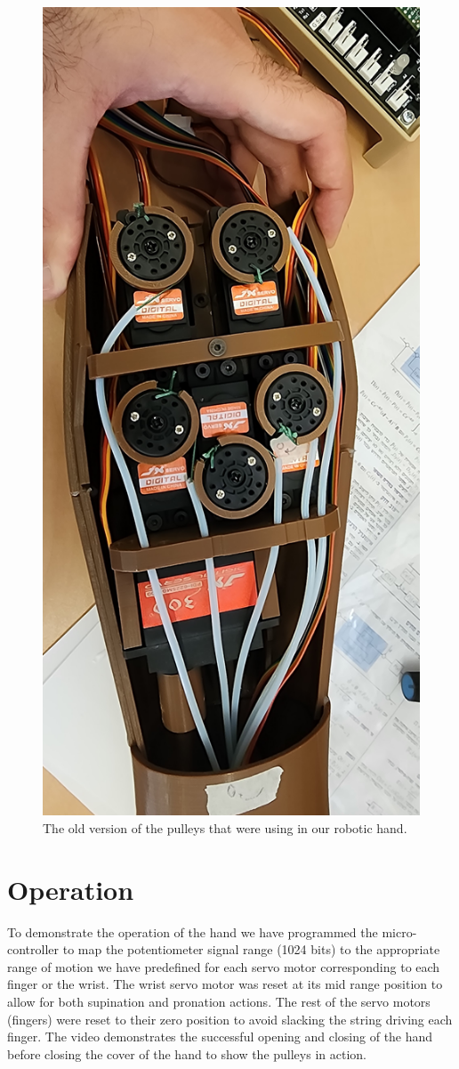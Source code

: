 \documentclass[10pt]{article}
\begin{document}
\begin{figure}[H]
    \centering
    \includegraphics[width=0.5\linewidth]{Final Project/pulleys.jpg}
    \caption{The old version of the pulleys that were using in our robotic hand.}
    \label{fig:pulleys}
\end{figure}

\section*{Operation}
To demonstrate the operation of the hand we have programmed the micro-controller to map the potentiometer signal range (1024 bits) to the appropriate range of motion we have predefined for each servo motor corresponding to each finger or the wrist. 
The wrist servo motor was reset at its mid range position to allow for both supination and pronation actions. The rest of the servo motors (fingers) were reset to their zero position to avoid slacking the string driving each finger.
The video demonstrates the successful opening and closing of the hand before closing the cover of the hand to show the pulleys in action.
\end{document}
